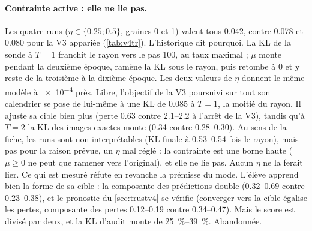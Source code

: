\documentclass[11pt,a4paper]{article}
\begin{document}
\paragraph{Contrainte active : elle ne lie pas.} Les quatre runs ($\eta\in\{\num{0.25};\num{0.5}\}$,
graines 0 et 1) valent tous \num{0.042}, contre \num{0.078} et \num{0.080} pour la V3 appariée
(\cref{tab:v4tr}). L'historique dit pourquoi. La KL de la sonde à $T=1$ franchit le rayon vers le pas
100, au taux maximal ; $\mu$ monte pendant la deuxième époque, ramène la KL sous le rayon, puis
retombe à 0 et y reste de la troisième à la dixième époque. Les deux valeurs de $\eta$ donnent le même
modèle à \num{e-4} près. Libre, l'objectif de la V3 poursuivi sur tout son calendrier se pose de
lui-même à une KL de \num{0.085} à $T=1$, la moitié du rayon. Il ajuste sa cible bien plus (perte
\num{0.63} contre \numrange{2.1}{2.2} à l'arrêt de la V3), tandis qu'à $T=2$ la KL des images exactes
monte (\num{0.34} contre \numrange{0.28}{0.30}). Au sens de la fiche, les runs sont non
interprétables (KL finale à \numrange{0.53}{0.54} fois le rayon), mais pas pour la raison prévue,
un $\eta$ mal réglé : la contrainte est une borne haute ($\mu\ge0$ ne peut que ramener vers
l'original), et elle ne lie pas. Aucun $\eta$ ne la ferait lier. Ce qui est mesuré réfute en
revanche la prémisse du mode. L'élève apprend bien la forme de sa cible : la composante des
prédictions double (\numrange{0.32}{0.69} contre \numrange{0.23}{0.38}), et le pronostic du
\cref{sec:trustv4} se vérifie (converger vers la cible égalise les pertes, composante des pertes
\numrange{0.12}{0.19} contre \numrange{0.34}{0.47}). Mais le score est divisé par deux, et la KL
d'audit monte de \SIrange{25}{39}{\percent}. Abandonnée.
\end{document}

